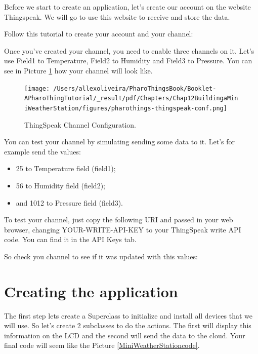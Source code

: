 \documentclass[10pt,twoside,english]{_support/latex/sbabook/sbabook}
\begin{document}
Before we start to create an application, let's create our account on the website Thingspeak. We will go to use this website to receive and store the data.

Follow this tutorial to create your account and your channel:


Once you've created your channel, you need to enable three channels on it. Let's use Field1 to Temperature, Field2 to Humidity and Field3 to Pressure. You can see in Picture \ref{ThingspeakChannelConf} how your channel will look like.


\begin{figure}

\begin{center}
\texttt{[image: /Users/allexoliveira/PharoThingsBook/Booklet-APharoThingTutorial/\_result/pdf/Chapters/Chap12BuildingaMiniWeatherStation/figures/pharothings-thingspeak-conf.png]}\caption{ThingSpeak Channel Configuration.\label{ThingspeakChannelConf}}\end{center}
\end{figure}


You can test your channel by simulating sending some data to it. Let's for example send the values:

\begin{itemize}
\item 25 to Temperature field (field1);
\item 56 to Humidity field (field2);
\item and 1012 to Pressure field (field3).
\end{itemize}

To test your channel, just copy the following URI and passed in your web browser, changing YOUR-WRITE-API-KEY to your ThingSpeak write API code. You can find it in the API Keys tab. 


So check you channel to see if it was updated with this values:

\section{Creating the application}
The first step lets create a Superclass to initialize and install all devices that we will use. So let's create 2 subclasses to do the actions. The first will display this information on the LCD and the second will send the data to the cloud. Your final code will seem like the Picture \ref{MiniWeatherStationcode}.
\end{document}
